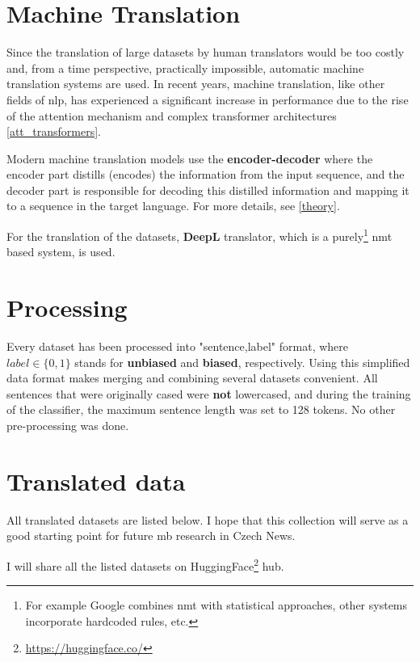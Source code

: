  
 
 
 
\section{Machine Translation}\label{DeepL}
Since the translation of large datasets by human translators would be too costly and, from a time perspective, practically impossible, automatic machine translation systems are used. In recent years, machine translation, like other fields of \Gls{nlp}, has experienced a significant increase in performance due to the rise of the attention mechanism and complex transformer architectures \ref{att_transformers}.

Modern machine translation models use the \textbf{encoder-decoder} where the encoder part distills (encodes) the information from the input sequence, and the decoder part is responsible for decoding this distilled information and mapping it to a sequence in the target language. For more details, see \ref{theory}.

For the translation of the datasets, \textbf{DeepL} translator, which is a purely\footnote{For example Google combines \Gls{nmt} with statistical approaches, other systems incorporate hardcoded rules, etc.} \Gls{nmt} based system, is used.






\section{Processing}\label{processing}
Every dataset has been processed into "sentence,label" format, where $label \in \{0,1\}$ stands for \textbf{unbiased} and \textbf{biased}, respectively. Using this simplified data format makes merging and combining several datasets convenient. All sentences that were originally cased were \textbf{not} lowercased, and during the training of the classifier, the maximum sentence length was set to 128 tokens. No other pre-processing was done.

\section{Translated data}
All translated datasets are listed below. I hope that this collection will serve as a good starting point for future \gls{mb} research in Czech News.

I will share all the listed datasets on HuggingFace\footnote{\url{https://huggingface.co/}} hub.

